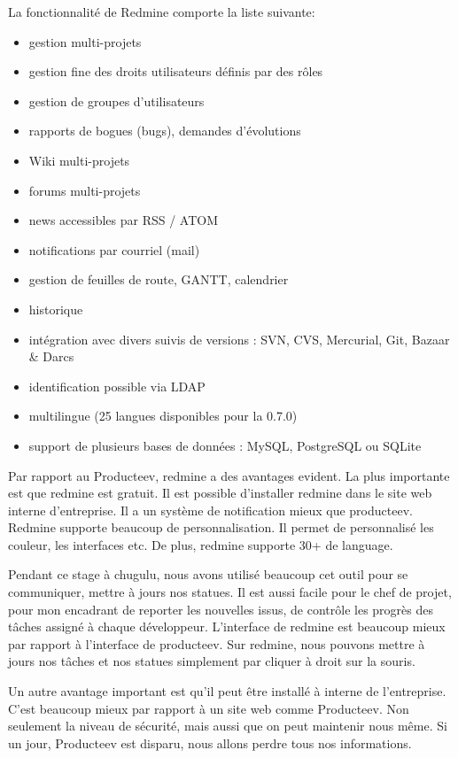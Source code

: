 La fonctionnalité de Redmine comporte la liste suivante:
\begin{itemize}
	\item gestion multi-projets
	\item gestion fine des droits utilisateurs définis par des rôles
	\item gestion de groupes d'utilisateurs
	\item rapports de bogues (bugs), demandes d'évolutions
	\item Wiki multi-projets
	\item forums multi-projets
	\item news accessibles par RSS / ATOM
	\item notifications par courriel (mail)
	\item gestion de feuilles de route, GANTT, calendrier
	\item historique
	\item intégration avec divers suivis de versions : SVN, CVS, Mercurial, Git, Bazaar & Darcs
	\item identification possible via LDAP
	\item multilingue (25 langues disponibles pour la 0.7.0)
	\item support de plusieurs bases de données : MySQL, PostgreSQL ou SQLite
\end{itemize}

Par rapport au Producteev, redmine a des avantages evident. La plus importante est que redmine est gratuit. Il est possible d'installer redmine dans le site web interne d'entreprise. Il a un système de notification mieux que producteev. Redmine supporte beaucoup de personnalisation. Il permet de personnalisé les couleur, les interfaces etc. De plus, redmine supporte 30+ de language. 

Pendant ce stage à chugulu, nous avons utilisé beaucoup cet outil pour se communiquer, mettre à jours nos statues. Il est aussi facile pour le chef de projet, pour mon encadrant de reporter les nouvelles issus, de contrôle les progrès des tâches assigné à chaque développeur. L'interface de redmine est beaucoup mieux par rapport à l'interface de producteev. Sur redmine, nous pouvons mettre à jours nos tâches et nos statues simplement par cliquer à droit sur la souris. 

Un autre avantage important est qu'il peut être installé à interne de l'entreprise. C'est beaucoup mieux par rapport à un site web comme Producteev. Non seulement la niveau de sécurité, mais aussi que on peut maintenir nous même. Si un jour, Producteev est disparu, nous allons perdre tous nos informations.

